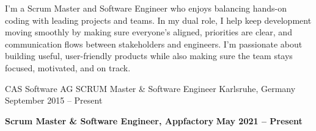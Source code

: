 \documentclass[10pt, a4paper]{cvhari}
\begin{document}

\makecvheader
\medskip



    \par
    I’m a Scrum Master and Software Engineer who enjoys balancing hands-on coding with leading projects and teams. In my dual role, I help keep development moving smoothly by making sure everyone’s aligned, priorities are clear, and communication flows between stakeholders and engineers. I’m passionate about building useful, user-friendly products while also making sure the team stays focused, motivated, and on track.
    \par
\medskip



    \company
        {CAS Software AG}
        {SCRUM Master \& Software Engineer}
        {Karlsruhe, Germany}
        {September 2015 -- Present}
    \vspace{0.5em}

    \textbf{Scrum Master \& Software Engineer, Appfactory} \hfill \textbf{May 2021 -- Present}

    \vspace{0.2em}
\end{document}
